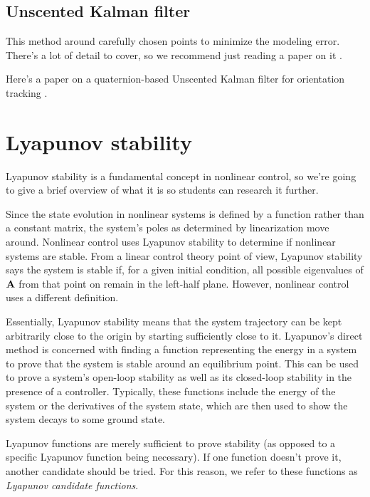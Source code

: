\subsection{Unscented Kalman filter}

This method  around carefully chosen points
to minimize the modeling error. There's a lot of detail to cover, so we
recommend just reading a paper on it \cite{bib:unscented-kalman-filter}.

Here's a paper on a quaternion-based Unscented Kalman filter for orientation
tracking \cite{bib:ukf-state-tracking}.

\section{Lyapunov stability}

Lyapunov stability is a fundamental concept in nonlinear control, so we're going
to give a brief overview of what it is so students can research it further.

Since the \gls{state} evolution in nonlinear \glspl{system} is defined by a
function rather than a constant matrix, the \gls{system}'s poles as determined
by \gls{linearization} move around. Nonlinear control uses Lyapunov stability to
determine if nonlinear \glspl{system} are stable. From a linear control theory
point of view, Lyapunov stability says the \gls{system} is stable if, for a
given initial condition, all possible eigenvalues of $\mathbf{A}$ from that point
on remain in the left-half plane. However, nonlinear control uses a different
definition.

Essentially, Lyapunov stability means that the \gls{system} trajectory can be
kept arbitrarily close to the origin by starting sufficiently close to it.
Lyapunov's direct method is concerned with finding a function representing the
energy in a \gls{system} to prove that the \gls{system} is stable around an
equilibrium point. This can be used to prove a \gls{system}'s open-loop
stability as well as its closed-loop stability in the presence of a controller.
Typically, these functions include the energy of the \gls{system} or the
derivatives of the \gls{system} \gls{state}, which are then used to show the
\gls{system} decays to some ground state.

Lyapunov functions are merely sufficient to prove stability (as opposed to a
specific Lyapunov function being necessary). If one function doesn't prove it,
another candidate should be tried. For this reason, we refer to these functions
as \textit{Lyapunov candidate functions}.

